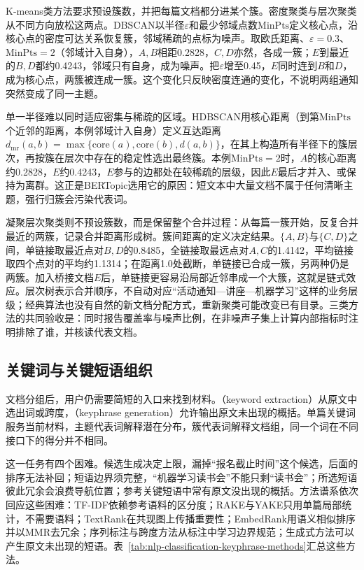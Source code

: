 K-means类方法要求预设簇数，并把每篇文档都分进某个簇。密度聚类与层次聚类从不同方向放松这两点。DBSCAN以半径$\varepsilon$和最少邻域点数$\mathrm{MinPts}$定义核心点，沿核心点的密度可达关系恢复簇，邻域稀疏的点标为噪声。取欧氏距离、$\varepsilon=0.3$、$\mathrm{MinPts}=2$（邻域计入自身），$A,B$相距0.2828，$C,D$亦然，各成一簇；$E$到最近的$B,D$都约0.4243，邻域只有自身，成为噪声。把$\varepsilon$增至0.45，$E$同时连到$B$和$D$，成为核心点，两簇被连成一簇。这个变化只反映密度连通的变化，不说明两组通知突然变成了同一主题。

单一半径难以同时适应密集与稀疏的区域。HDBSCAN用核心距离（到第$\mathrm{MinPts}$个近邻的距离，本例邻域计入自身）定义互达距离$d_{\mathrm{mr}}(a,b)=\max\{\mathrm{core}(a),\mathrm{core}(b),d(a,b)\}$，在其上构造所有半径下的簇层次，再按簇在层次中存在的稳定性选出最终簇。本例$\mathrm{MinPts}=2$时，$A$的核心距离约0.2828，$E$约0.4243，$E$参与的边都处在较稀疏的层级，因此$E$最后才并入、或保持为离群。这正是BERTopic选用它的原因：短文本中大量文档不属于任何清晰主题，强行归簇会污染代表词。

凝聚层次聚类则不预设簇数，而是保留整个合并过程：从每篇一簇开始，反复合并最近的两簇，记录合并距离形成树。簇间距离的定义决定结果。$\{A,B\}$与$\{C,D\}$之间，单链接取最近点对$B,D$的0.8485，全链接取最远点对$A,C$的1.4142，平均链接取四个点对的平均约1.1314；在距离1.0处截断，单链接已合成一簇，另两种仍是两簇。加入桥接文档$E$后，单链接更容易沿局部近邻串成一个大簇，这就是链式效应。层次树表示合并顺序，不自动对应“活动通知—讲座—机器学习”这样的业务层级；经典算法也没有自然的新文档分配方式，重新聚类可能改变已有目录。三类方法的共同验收是：同时报告覆盖率与噪声比例，在非噪声子集上计算内部指标时注明排除了谁，并核读代表文档。

\subsection{关键词与关键短语组织}
\label{sec:nlp-classification-keyphrases}

文档分组后，用户仍需要简短的入口来找到材料。（keyword extraction）从原文中选出词或跨度，（keyphrase generation）允许输出原文未出现的概括。单篇关键词服务当前材料，主题代表词解释潜在分布，簇代表词解释文档组，同一个词在不同接口下的得分并不相同。

这一任务有四个困难。候选生成决定上限，漏掉“报名截止时间”这个候选，后面的排序无法补回；短语边界须完整，“机器学习读书会”不能只剩“读书会”；所选短语彼此冗余会浪费导航位置；参考关键短语中常有原文没出现的概括。方法谱系依次回应这些困难：TF-IDF依赖参考语料的区分度；RAKE与YAKE只用单篇局部统计，不需要语料；TextRank在共现图上传播重要性；EmbedRank用语义相似排序并以MMR去冗余；序列标注与跨度方法从标注中学习边界规范；生成式方法可以产生原文未出现的短语。表~\ref{tab:nlp-classification-keyphrase-methods}汇总这些方法。

